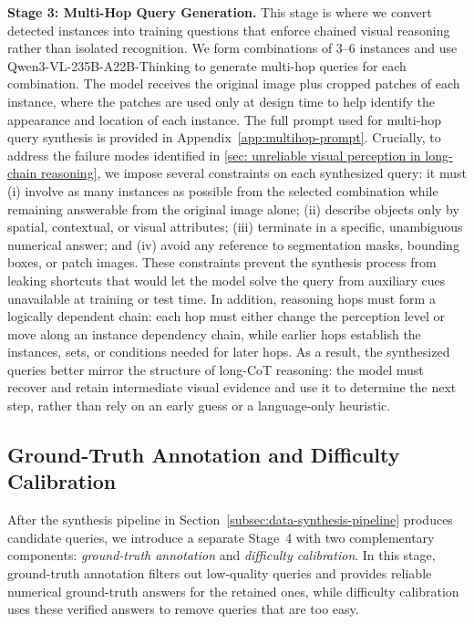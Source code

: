 \textbf{Stage 3: Multi-Hop Query Generation.}
This stage is where we convert detected instances into training questions that enforce chained visual reasoning rather than isolated recognition.
We form combinations of 3--6 instances and use Qwen3-VL-235B-A22B-Thinking to generate multi-hop queries for each combination.
The model receives the original image plus cropped patches of each instance, where the patches are used only at design time to help identify the appearance and location of each instance. The full prompt used for multi-hop query synthesis is provided in Appendix~\ref{app:multihop-prompt}.
Crucially, to address the failure modes identified in \cref{sec: unreliable visual perception in long-chain reasoning}, we impose several constraints on each synthesized query: it must (i) involve as many instances as possible from the selected combination while remaining answerable from the original image alone; (ii) describe objects only by spatial, contextual, or visual attributes; (iii) terminate in a specific, unambiguous numerical answer; and (iv) avoid any reference to segmentation masks, bounding boxes, or patch images.
These constraints prevent the synthesis process from leaking shortcuts that would let the model solve the query from auxiliary cues unavailable at training or test time.
In addition, reasoning hops must form a logically dependent chain: each hop must either change the perception level or move along an instance dependency chain, while earlier hops establish the instances, sets, or conditions needed for later hops.
As a result, the synthesized queries better mirror the structure of long-CoT reasoning: the model must recover and retain intermediate visual evidence and use it to determine the next step, rather than rely on an early guess or a language-only heuristic.


\subsection{Ground-Truth Annotation and Difficulty Calibration}
\label{subsec:ground-truth-annotation}

After the synthesis pipeline in Section~\ref{subsec:data-synthesis-pipeline} produces candidate queries, we introduce a separate Stage~4 with two complementary components: \emph{ground-truth annotation} and \emph{difficulty calibration}.
In this stage, ground-truth annotation filters out low-quality queries and provides reliable numerical ground-truth answers for the retained ones, while difficulty calibration uses these verified answers to remove queries that are too easy.

